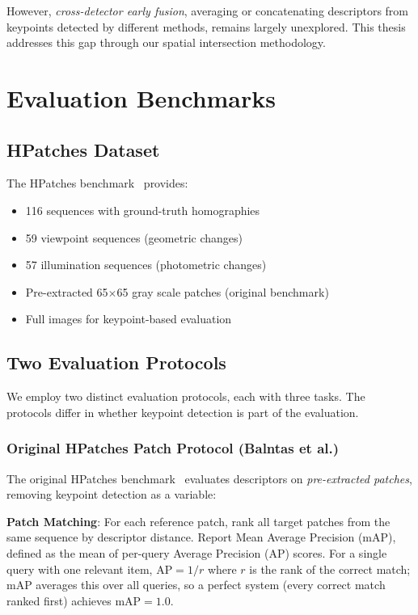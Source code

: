 However, \textit{cross-detector early fusion}, averaging or concatenating descriptors from keypoints detected by different methods, remains largely unexplored. This thesis addresses this gap through our spatial intersection methodology.

\section{Evaluation Benchmarks}

\subsection{HPatches Dataset}

The HPatches benchmark~\cite{balntas2017hpatches} provides:
\begin{itemize}
    \item 116 sequences with ground-truth homographies
    \item 59 viewpoint sequences (geometric changes)
    \item 57 illumination sequences (photometric changes)
    \item Pre-extracted 65$\times$65 gray scale patches (original benchmark)
    \item Full images for keypoint-based evaluation
\end{itemize}

\subsection{Two Evaluation Protocols}

We employ two distinct evaluation protocols, each with three tasks. The protocols differ in whether keypoint detection is part of the evaluation.

\subsubsection{Original HPatches Patch Protocol (Balntas et al.)}

The original HPatches benchmark~\cite{balntas2017hpatches} evaluates descriptors on \textit{pre-extracted patches}, removing keypoint detection as a variable:

\textbf{Patch Matching}: For each reference patch, rank all target patches from the same sequence by descriptor distance. Report Mean Average Precision (mAP), defined as the mean of per-query Average Precision (AP) scores. For a single query with one relevant item, $\text{AP} = 1/r$ where $r$ is the rank of the correct match; mAP averages this over all queries, so a perfect system (every correct match ranked first) achieves $\text{mAP} = 1.0$.

